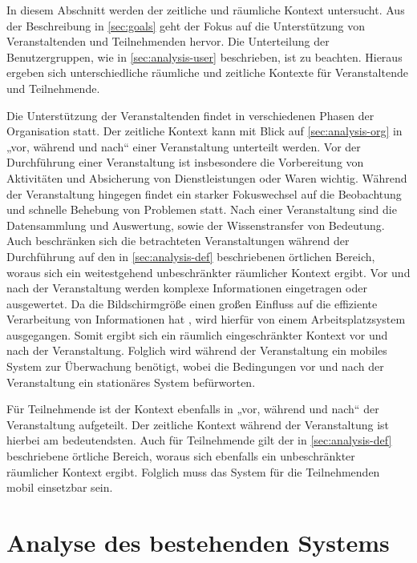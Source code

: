 In diesem Abschnitt werden der zeitliche und räumliche Kontext untersucht. Aus
der Beschreibung in \autoref{sec:goals} geht der Fokus auf die Unterstützung von
Veranstaltenden und Teilnehmenden hervor. Die Unterteilung der Benutzergruppen,
wie in \autoref{sec:analysis-user} beschrieben, ist zu beachten. Hieraus ergeben
sich unterschiedliche räumliche und zeitliche Kontexte für Veranstaltende und
Teilnehmende.

Die Unterstützung der Veranstaltenden findet in verschiedenen Phasen der
Organisation statt. Der zeitliche Kontext kann mit Blick auf
\autoref{sec:analysis-org} in „vor, während und nach“ einer Veranstaltung
unterteilt werden. Vor der Durchführung einer Veranstaltung ist insbesondere die
Vorbereitung von Aktivitäten und Absicherung von Dienstleistungen oder Waren
wichtig. Während der Veranstaltung hingegen findet ein starker Fokuswechsel auf
die Beobachtung und schnelle Behebung von Problemen statt. Nach einer
Veranstaltung sind die Datensammlung und Auswertung, sowie der Wissenstransfer
von Bedeutung. \\
Auch beschränken sich die betrachteten Veranstaltungen während der Durchführung
auf den in \autoref{sec:analysis-def} beschriebenen örtlichen Bereich, woraus
sich ein weitestgehend unbeschränkter räumlicher Kontext ergibt. Vor und nach
der Veranstaltung werden komplexe Informationen eingetragen oder ausgewertet. Da
die Bildschirmgröße einen großen Einfluss auf die effiziente Verarbeitung von
Informationen hat \cite{Ni2006}, wird hierfür von einem Arbeitsplatzsystem ausgegangen. Somit
ergibt sich ein räumlich eingeschränkter Kontext vor und nach der Veranstaltung.
Folglich wird während der Veranstaltung ein mobiles System zur Überwachung
benötigt, wobei die Bedingungen vor und nach der Veranstaltung ein stationäres
System befürworten.

Für Teilnehmende ist der Kontext ebenfalls in „vor, während und nach“ der
Veranstaltung aufgeteilt. Der zeitliche Kontext während der Veranstaltung ist
hierbei am bedeutendsten. Auch für Teilnehmende gilt der in
\autoref{sec:analysis-def} beschriebene örtliche Bereich, woraus sich ebenfalls
ein unbeschränkter räumlicher Kontext ergibt. Folglich muss das System für die
Teilnehmenden mobil einsetzbar sein.


\section{Analyse des bestehenden Systems} \label{sec:analysis-old}

